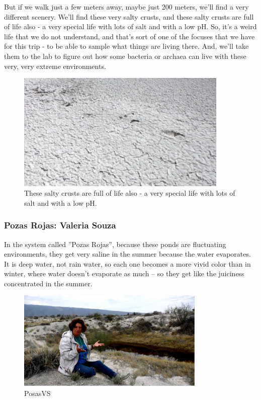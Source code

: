 \documentclass[]{article}
\begin{document}
But if we walk just a few meters away, maybe just 200 meters, we'll find a very different scenery. We'll find these very salty crusts, and these salty crusts are full of life also - a very special life with lots of salt and with a low pH. So, it's a weird life that we do not understand, and that's sort of one of the focuses that we have for this trip - to be able to sample what things are living there. And, we'll take them to the lab to figure out how some bacteria or archaea can live with these very, very extreme environments.

\begin{figure}[H]
	\caption[These salty crusts are full of life also]{These salty crusts are full of life also - a very special life with lots of salt and with a low pH.} 
	\includegraphics[width=0.9\textwidth]{CuatroCienegas5}
\end{figure}

\subsubsection{Pozas Rojas: Valeria Souza}

In the system called ''Pozas Rojas'', because these ponds are fluctuating environments, they get very saline in the summer because the water evaporates. It is deep water, not rain water, so each one becomes a more vivid color than in winter, where water doesn't evaporate as much -- so they get like the juiciness concentrated in the summer.

\begin{figure}[H]
	\caption{PosasVS}\label{fig:PosasVS}
	\includegraphics[width=0.8\textwidth]{PosasVS}
\end{figure}
\end{document}
